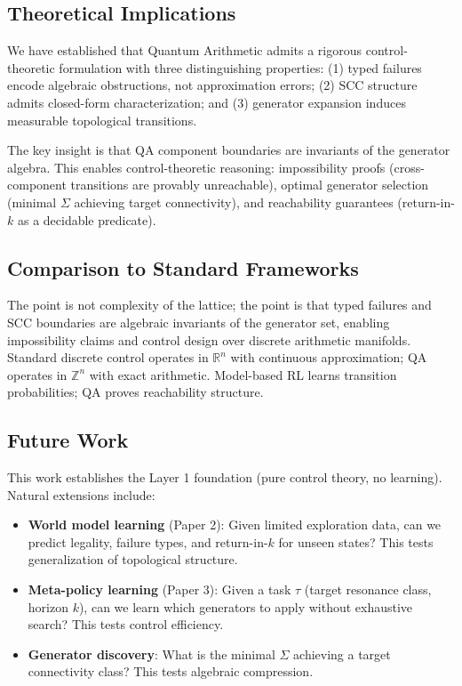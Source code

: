 \documentclass[11pt]{article}
\theoremstyle{definition}
\begin{document}
\subsection{Theoretical Implications}

We have established that Quantum Arithmetic admits a rigorous control-theoretic formulation with three distinguishing properties: (1) typed failures encode algebraic obstructions, not approximation errors; (2) SCC structure admits closed-form characterization; and (3) generator expansion induces measurable topological transitions.

The key insight is that QA component boundaries are invariants of the generator algebra. This enables control-theoretic reasoning: impossibility proofs (cross-component transitions are provably unreachable), optimal generator selection (minimal $\Sigma$ achieving target connectivity), and reachability guarantees (return-in-$k$ as a decidable predicate).

\subsection{Comparison to Standard Frameworks}

The point is not complexity of the lattice; the point is that typed failures and SCC boundaries are algebraic invariants of the generator set, enabling impossibility claims and control design over discrete arithmetic manifolds. Standard discrete control operates in $\mathbb{R}^n$ with continuous approximation; QA operates in $\mathbb{Z}^n$ with exact arithmetic. Model-based RL learns transition probabilities; QA proves reachability structure.

\subsection{Future Work}

This work establishes the Layer 1 foundation (pure control theory, no learning). Natural extensions include:

\begin{itemize}
\item \textbf{World model learning} (Paper 2): Given limited exploration data, can we predict legality, failure types, and return-in-$k$ for unseen states? This tests generalization of topological structure.
\item \textbf{Meta-policy learning} (Paper 3): Given a task $\tau$ (target resonance class, horizon $k$), can we learn which generators to apply without exhaustive search? This tests control efficiency.
\item \textbf{Generator discovery}: What is the minimal $\Sigma$ achieving a target connectivity class? This tests algebraic compression.
\end{itemize}
\end{document}
